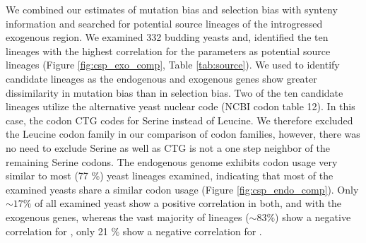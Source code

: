 \documentclass[fleqn,letterpaper]{article}
\begin{document}
We combined our estimates of mutation bias \DM and selection bias \DE with synteny information and searched for potential source lineages of the introgressed exogenous region.
We examined 332 budding yeasts \citep{shen2018} and, identified the ten lineages with the highest correlation for the \DM parameters as potential source lineages (Figure \ref{fig:csp_exo_comp}, Table \ref{tab:source}).
We used \DM to identify candidate lineages as the endogenous and exogenous genes show greater dissimilarity in mutation bias than in selection bias.
Two of the ten candidate lineages utilize the alternative yeast nuclear code (NCBI codon table 12). 
In this case, the codon CTG codes for Serine instead of Leucine. 
We therefore excluded the Leucine codon family in our comparison of codon families, however, there was no need to exclude Serine as well as CTG is not a one step neighbor of the remaining Serine codons.
The endogenous \kluyveri genome exhibits codon usage very similar to most (77 \%) yeast lineages examined, indicating that most of the examined yeasts share a similar codon usage (Figure \ref{fig:csp_endo_comp}).
Only $\sim 17 \%$ of all examined yeast show a positive correlation in both, \DM and \DE with the exogenous genes, whereas the vast majority of lineages ($\sim 83 \%$) show a negative correlation for \DM, only 21 \% show a negative correlation for \DE.
\end{document}
